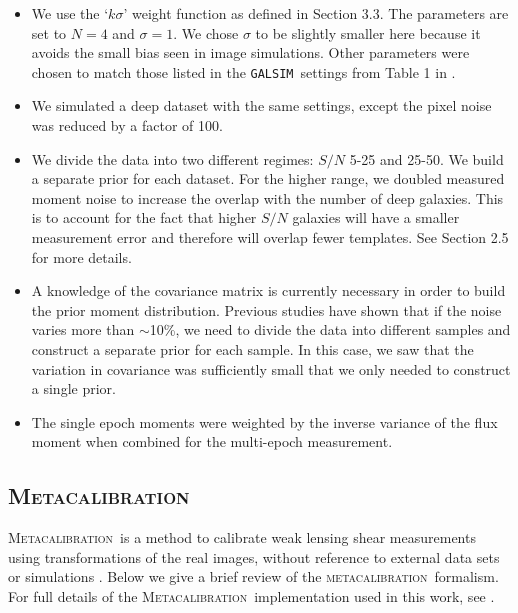 \documentclass[fleqn,useAMS,usenatbib]{mnras}
\newcommand{\galsim}{\texttt{GALSIM}}
\newcommand{\mcal}{\textsc{metacalibration}}
\newcommand{\Mcal}{\textsc{Metacalibration}}
\begin{document}
\begin{itemize}
\item We use the `$k\sigma$' weight function as defined in \cite{Bernstein2016} 
Section 3.3.  The parameters are set to $N=4$ and $\sigma=1$.  We chose 
$\sigma$ to be slightly smaller here because it avoids the small bias seen in 
image simulations.  Other parameters were chosen to match those listed in the 
\galsim\ settings from Table 1 in \cite{Bernstein2016}.
\item We simulated a deep dataset with the same settings, except the pixel 
noise was reduced by a factor of 100.
\item We divide the data into two different regimes: $S/N$ 5-25 and 25-50.  We 
build a separate prior for each dataset.  For the higher range, we doubled 
measured moment noise to increase the overlap with the number of deep galaxies.
This is to account for the fact that higher $S/N$ galaxies will have a smaller
measurement error and therefore will overlap fewer templates.  See \cite{Bernstein2016}
Section 2.5 for more details.
\item A knowledge of the covariance matrix is currently necessary in order to 
build the prior moment distribution.  Previous studies have shown that if the 
noise varies more than $\sim$10\%, we need to divide the data into different 
samples and construct a separate prior for each sample.  In this case, we saw 
that the variation in covariance was sufficiently small that we only needed to 
construct a single prior.
\item The single epoch moments were weighted by the inverse variance of the 
flux moment when combined for the multi-epoch measurement.  
\end{itemize}

\subsection{\Mcal}
\label{Section:Metacal}

\Mcal\ is a method to calibrate weak lensing shear measurements using
transformations of the real images, without reference to external data sets or
simulations \citep{HuffMand2017,SheldonHuff2017}.  Below we give a brief review
of the \mcal\ formalism.  For full details of the \Mcal\ implementation used in this work, see
\cite{SheldonHuff2017}.
\end{document}
